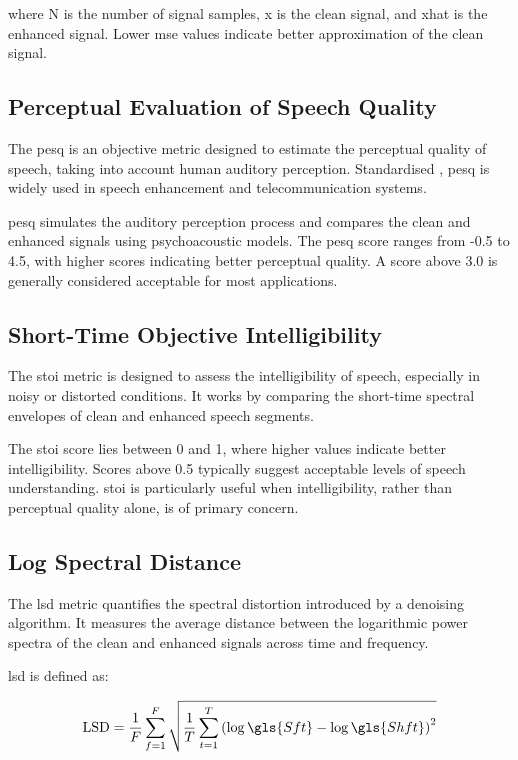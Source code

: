 where \gls{N} is the number of signal samples, \gls{x} is the clean signal, and \gls{xhat} is the enhanced signal. Lower \gls{mse} values indicate better approximation of the clean signal.

\subsection{Perceptual Evaluation of Speech Quality}
\label{subsec:pesq}

The \gls{pesq} is an objective metric designed to estimate the perceptual quality of speech, taking into account human auditory perception. Standardised \cite{itutp862}, \gls{pesq} is widely used in speech enhancement and telecommunication systems.

\gls{pesq} simulates the auditory perception process and compares the clean and enhanced signals using psychoacoustic models. The \gls{pesq} score ranges from -0.5 to 4.5, with higher scores indicating better perceptual quality. A score above 3.0 is generally considered acceptable for most applications.

\subsection{Short-Time Objective Intelligibility}
\label{subsec:stoi}

The \gls{stoi} metric is designed to assess the intelligibility of speech, especially in noisy or distorted conditions. It works by comparing the short-time spectral envelopes of clean and enhanced speech segments.

The \gls{stoi} score lies between 0 and 1, where higher values indicate better intelligibility. Scores above 0.5 typically suggest acceptable levels of speech understanding. \gls{stoi} is particularly useful when intelligibility, rather than perceptual quality alone, is of primary concern.

\subsection{Log Spectral Distance}
\label{subsec:lsd}

The \gls{lsd} metric quantifies the spectral distortion introduced by a denoising algorithm. It measures the average distance between the logarithmic power spectra of the clean and enhanced signals across time and frequency.

\gls{lsd} is defined as:

\begin{equation}
    \text{LSD} = \frac{1}{F} \sum_{f=1}^{F} \sqrt{ \frac{1}{T} \sum_{t=1}^{T} \left( \log \gls{Sft} - \log \gls{Shft} \right)^2 }
\end{equation}

